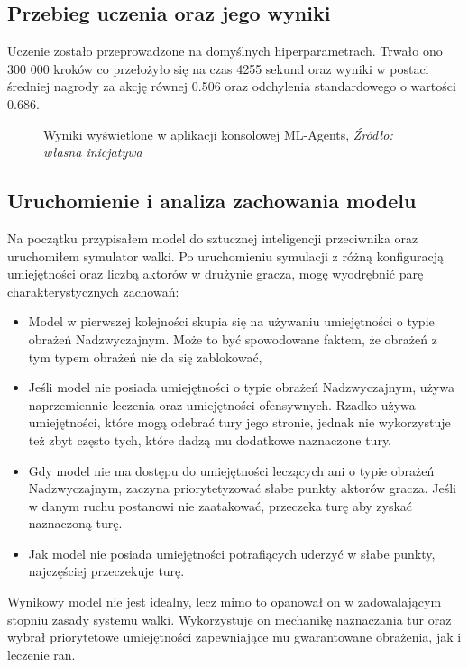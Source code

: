 \documentclass{SGGW-thesis}
\begin{document}
\subsection{Przebieg uczenia oraz jego wyniki}
Uczenie zostało przeprowadzone na domyślnych hiperparametrach. Trwało ono 300 000 kroków co przełożyło się na czas 4255 sekund oraz
wyniki w postaci średniej nagrody za akcję równej 0.506 oraz odchylenia standardowego o wartości 0.686.
\begin{figure}[H]
  \centering
  \noindent{}
  \addtocounter{figure}{6}
  \caption{Wyniki wyświetlone w aplikacji konsolowej ML-Agents, \textit{Źródło: własna inicjatywa}}
\end{figure}
\subsection{Uruchomienie i analiza zachowania modelu}
Na początku przypisałem model do sztucznej inteligencji przeciwnika oraz uruchomiłem symulator walki. Po uruchomieniu symulacji z różną konfiguracją umiejętności oraz liczbą aktorów w drużynie gracza, mogę wyodrębnić parę charakterystycznych zachowań:
\begin{itemize}
  \item Model w pierwszej kolejności skupia się na używaniu umiejętności o typie obrażeń Nadzwyczajnym. Może to być spowodowane faktem, że obrażeń z tym typem obrażeń nie da się zablokować,
  \item Jeśli model nie posiada umiejętności o typie obrażeń Nadzwyczajnym, używa naprzemiennie leczenia oraz umiejętności ofensywnych. Rzadko używa umiejętności, które mogą odebrać tury jego stronie, jednak nie wykorzystuje też zbyt często tych, które dadzą mu dodatkowe naznaczone tury.
  \item Gdy model nie ma dostępu do umiejętności leczących ani o typie obrażeń Nadzwyczajnym, zaczyna priorytetyzować słabe punkty aktorów gracza. Jeśli w danym ruchu postanowi nie zaatakować, przeczeka turę aby zyskać naznaczoną turę.
  \item Jak model nie posiada umiejętności potrafiących uderzyć w słabe punkty, najczęściej przeczekuje turę.  
\end{itemize}
\pagebreak
Wynikowy model nie jest idealny, lecz mimo to opanował on w zadowalającym stopniu zasady systemu walki. Wykorzystuje on mechanikę naznaczania tur oraz wybrał priorytetowe umiejętności zapewniające mu gwarantowane obrażenia, jak i leczenie ran.
\end{document}
